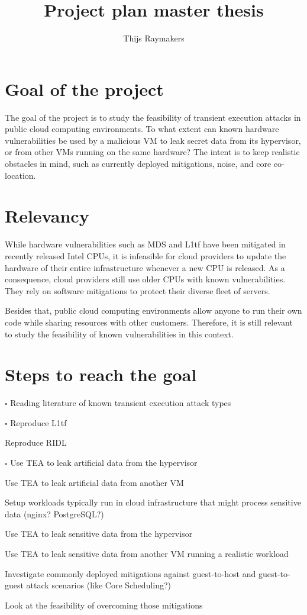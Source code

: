 \documentclass[draft, a4paper, 11pt]{article}
\title{Project plan master thesis}
\author{Thijs Raymakers}
\newcommand{\done}{\rlap{\raisebox{0.3ex}{\hspace{0.4ex}\scriptsize \ding{51}}}$\square$}
\begin{document}
\maketitle

\section{Goal of the project}
The goal of the project is to study the feasibility of transient execution attacks in public cloud computing environments.
To what extent can known hardware vulnerabilities be used by a malicious VM to leak secret data from its hypervisor, or from other VMs running on the same hardware?
The intent is to keep realistic obstacles in mind, such as currently deployed mitigations, noise, and core co-location.

\section{Relevancy}
While hardware vulnerabilities such as MDS and L1tf have been mitigated in recently released Intel CPUs, it is infeasible for cloud providers to update the hardware of their entire infrastructure whenever a new CPU is released.
As a consequence, cloud providers still use older CPUs with known vulnerabilities.
They rely on software mitigations to protect their diverse fleet of servers.

Besides that, public cloud computing environments allow anyone to run their own code while sharing resources with other customers.
Therefore, it is still relevant to study the feasibility of known vulnerabilities in this context.

\section{Steps to reach the goal}

\begin{todolist}
  \item[\done] Reading literature of known transient execution attack types
  \item[\done] Reproduce L1tf
  \item Reproduce RIDL
  \item[\done] Use TEA to leak artificial data from the hypervisor
  \item Use TEA to leak artificial data from another VM
  \item Setup workloads typically run in cloud infrastructure that might process sensitive data (nginx? PostgreSQL?)
  \item Use TEA to leak sensitive data from the hypervisor
  \item Use TEA to leak sensitive data from another VM running a realistic workload
  \item Investigate commonly deployed mitigations against guest-to-host and guest-to-guest attack scenarios (like Core Scheduling?)
  \item Look at the feasibility of overcoming those mitigations
\end{todolist}
\end{document}

